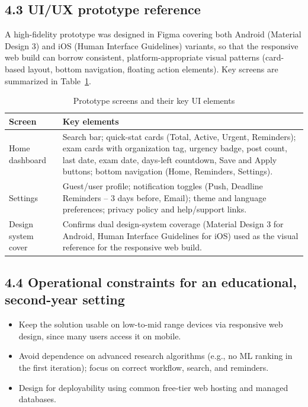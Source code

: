 \documentclass[11pt,a4paper]{article}
\begin{document}
\subsection*{4.3 UI/UX prototype reference}
A high-fidelity prototype was designed in Figma covering both Android
(Material Design 3) and iOS (Human Interface Guidelines) variants, so that
the responsive web build can borrow consistent, platform-appropriate visual
patterns (card-based layout, bottom navigation, floating action elements).
Key screens are summarized in Table~\ref{tab:screens}.

\begin{table}[h]
\centering
\begin{tabular}{|p{2.8cm}|p{9.7cm}|}
\hline
\textbf{Screen} & \textbf{Key elements} \\
\hline
Home dashboard & Search bar; quick-stat cards (Total, Active, Urgent,
Reminders); exam cards with organization tag, urgency badge, post count,
last date, exam date, days-left countdown, Save and Apply buttons; bottom
navigation (Home, Reminders, Settings). \\
\hline
Settings & Guest/user profile; notification toggles (Push, Deadline
Reminders -- 3 days before, Email); theme and language preferences; privacy
policy and help/support links. \\
\hline
Design system cover & Confirms dual design-system coverage (Material Design
3 for Android, Human Interface Guidelines for iOS) used as the visual
reference for the responsive web build. \\
\hline
\end{tabular}
\label{tab:screens}
\caption{Prototype screens and their key UI elements}
\end{table}

\subsection*{4.4 Operational constraints for an educational, second-year setting}
\begin{itemize}[leftmargin=1.5em]
  \item Keep the solution usable on low-to-mid range devices via responsive web
  design, since many users access it on mobile.
  \item Avoid dependence on advanced research algorithms (e.g., no ML ranking in
  the first iteration); focus on correct workflow, search, and reminders.
  \item Design for deployability using common free-tier web hosting and managed
  databases.
\end{itemize}
\end{document}
